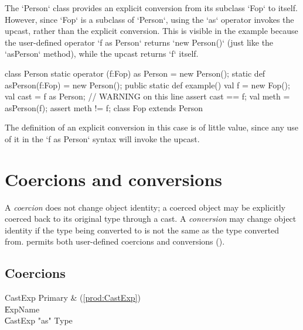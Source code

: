 \begin{ex}
The \xcd`Person` class provides an explicit conversion 
from its subclass \xcd`Fop` to itself. 
However, since \xcd`Fop` is a subclass of \xcd`Person`, 
using the \xcd`as` operator invokes the upcast, rather than the explicit
conversion.  This is visible in the example because the user-defined operator 
\xcd`f as Person` returns \xcd`new Person()` (just like the \xcd`asPerson`
method), while the 
upcast returns \xcd`f` itself.   
\begin{xten}
class Person {
  static operator (f:Fop) as Person = new Person();
  static def asPerson(f:Fop) = new Person();
  public static def example() {
     val f = new Fop();
     val cast = f as Person; // WARNING on this line
     assert cast == f;
     val meth = asPerson(f);
     assert meth != f;
  }
}
class Fop extends Person {}
\end{xten}

The definition of an explicit conversion in this case is of little value,
since any use of it in the \xcd`f as Person` syntax will invoke the upcast.  
\end{ex}

\section{Coercions and conversions}
\label{XtenConversions}
\label{User-definedCoercions}


A {\em coercion} does not change object identity; a coerced object may
be explicitly coerced back to its original type through a cast. A {\em
  conversion} may change object identity if the type being converted
to is not the same as the type converted from. \Xten{} permits both 
user-defined coercions and conversions ().


\subsection{Coercions}

\begin{bbgrammar}
             CastExp \: Primary & (\ref{prod:CastExp}) \\
                     \| ExpName \\
                     \| CastExp \xcd"as" Type \\
\end{bbgrammar}


